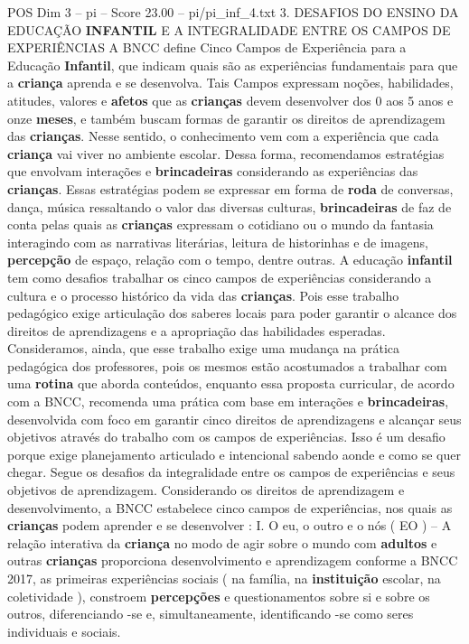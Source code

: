 \begin{textsample}{POS Dim 3 – pi – Score 23.00 – pi/pi\_inf\_4.txt}  \label{ex:f3_pos_252}
3.
DESAFIOS DO ENSINO DA EDUCAÇÃO \textbf{INFANTIL} E A INTEGRALIDADE ENTRE OS CAMPOS DE EXPERIÊNCIAS A BNCC define Cinco Campos de Experiência para a Educação \textbf{Infantil}, que indicam quais são as experiências fundamentais para que a \textbf{criança} aprenda e se desenvolva.
Tais Campos expressam noções, habilidades, atitudes, valores e \textbf{afetos} que as \textbf{crianças} devem desenvolver dos 0 aos 5 anos e onze \textbf{meses}, e também buscam formas de garantir os direitos de aprendizagem das \textbf{crianças}.
Nesse sentido, o conhecimento vem com a experiência que cada \textbf{criança} vai viver no ambiente escolar.
Dessa forma, recomendamos estratégias que envolvam interações e \textbf{brincadeiras} considerando as experiências das \textbf{crianças}.
Essas estratégias podem se expressar em forma de \textbf{roda} de conversas, dança, música ressaltando o valor das diversas culturas, \textbf{brincadeiras} de faz de conta pelas quais as \textbf{crianças} expressam o cotidiano ou o mundo da fantasia interagindo com as narrativas literárias, leitura de historinhas e de imagens, \textbf{percepção} de espaço, relação com o tempo, dentre outras.
A educação \textbf{infantil} tem como desafios trabalhar os cinco campos de experiências considerando a cultura e o processo histórico da vida das \textbf{crianças}.
Pois esse trabalho pedagógico exige articulação dos saberes locais para poder garantir o alcance dos direitos de aprendizagens e a apropriação das habilidades esperadas.
Consideramos, ainda, que esse trabalho exige uma mudança na prática pedagógica dos professores, pois os mesmos estão acostumados a trabalhar com uma \textbf{rotina} que aborda conteúdos, enquanto essa proposta curricular, de acordo com a BNCC, recomenda uma prática com base em interações e \textbf{brincadeiras}, desenvolvida com foco em garantir cinco direitos de aprendizagens e alcançar seus objetivos através do trabalho com os campos de experiências.
Isso é um desafio porque exige planejamento articulado e intencional sabendo aonde e como se quer chegar.
Segue os desafios da integralidade entre os campos de experiências e seus objetivos de aprendizagem.
Considerando os direitos de aprendizagem e desenvolvimento, a BNCC estabelece cinco campos de experiências, nos quais as \textbf{crianças} podem aprender e se desenvolver : I.
O eu, o outro e o nós ( EO ) – A relação interativa da \textbf{criança} no modo de agir sobre o mundo com \textbf{adultos} e outras \textbf{crianças} proporciona desenvolvimento e aprendizagem conforme a BNCC 2017, as primeiras experiências sociais ( na família, na \textbf{instituição} escolar, na coletividade ), constroem \textbf{percepções} e questionamentos sobre si e sobre os outros, diferenciando -se e, simultaneamente, identificando -se como seres individuais e sociais.

\end{textsample}
